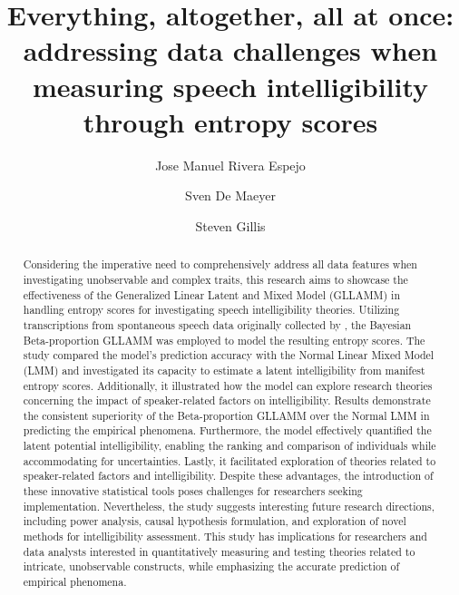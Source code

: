 \documentclass[
  authoryear,
  preprint,
  1p]{elsarticle}
\begin{document}
\begin{frontmatter}
\title{Everything, altogether, all at once: addressing data challenges
when measuring speech intelligibility through entropy scores}
\author[1]{Jose Manuel Rivera Espejo%
%
}
\author[1]{Sven De Maeyer%
%
}
\author[2]{Steven Gillis%
%
}





        
\begin{abstract}
Considering the imperative need to comprehensively address all data
features when investigating unobservable and complex traits, this
research aims to showcase the effectiveness of the Generalized Linear
Latent and Mixed Model (GLLAMM)
\citep{Rabe_et_al_2004a, Rabe_et_al_2004b, Rabe_et_al_2004c, Skrondal_et_al_2004a}
in handling entropy scores for investigating speech intelligibility
theories. Utilizing transcriptions from spontaneous speech data
originally collected by \citet{Boonen_et_al_2021}, the Bayesian
Beta-proportion GLLAMM was employed to model the resulting entropy
scores. The study compared the model's prediction accuracy with the
Normal Linear Mixed Model (LMM) \citep{Holmes_et_al_2019} and
investigated its capacity to estimate a latent intelligibility from
manifest entropy scores. Additionally, it illustrated how the model can
explore research theories concerning the impact of speaker-related
factors on intelligibility. Results demonstrate the consistent
superiority of the Beta-proportion GLLAMM over the Normal LMM in
predicting the empirical phenomena. Furthermore, the model effectively
quantified the latent potential intelligibility, enabling the ranking
and comparison of individuals while accommodating for uncertainties.
Lastly, it facilitated exploration of theories related to
speaker-related factors and intelligibility. Despite these advantages,
the introduction of these innovative statistical tools poses challenges
for researchers seeking implementation. Nevertheless, the study suggests
interesting future research directions, including power analysis, causal
hypothesis formulation, and exploration of novel methods for
intelligibility assessment. This study has implications for researchers
and data analysts interested in quantitatively measuring and testing
theories related to intricate, unobservable constructs, while
emphasizing the accurate prediction of empirical phenomena.
\end{abstract}






\end{frontmatter}
\end{document}
